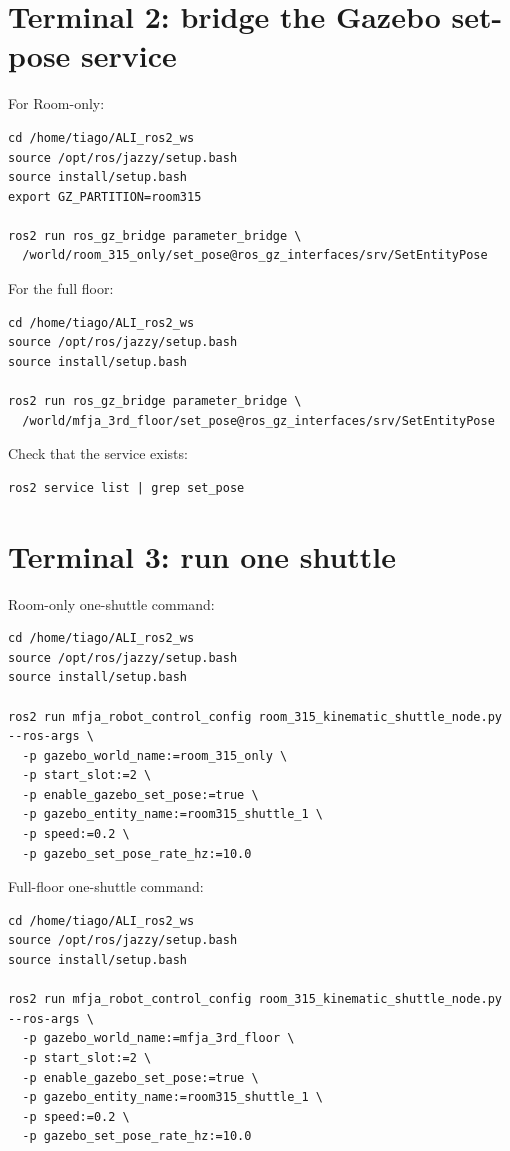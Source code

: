 \documentclass[12pt,a4paper]{report}
\begin{document}
\section{Terminal 2: bridge the Gazebo set-pose service}

For Room-only:

\begin{lstlisting}[style=terminalcode]
cd /home/tiago/ALI_ros2_ws
source /opt/ros/jazzy/setup.bash
source install/setup.bash
export GZ_PARTITION=room315

ros2 run ros_gz_bridge parameter_bridge \
  /world/room_315_only/set_pose@ros_gz_interfaces/srv/SetEntityPose
\end{lstlisting}

For the full floor:

\begin{lstlisting}[style=terminalcode]
cd /home/tiago/ALI_ros2_ws
source /opt/ros/jazzy/setup.bash
source install/setup.bash

ros2 run ros_gz_bridge parameter_bridge \
  /world/mfja_3rd_floor/set_pose@ros_gz_interfaces/srv/SetEntityPose
\end{lstlisting}

Check that the service exists:

\begin{lstlisting}[style=terminalcode]
ros2 service list | grep set_pose
\end{lstlisting}

\section{Terminal 3: run one shuttle}

Room-only one-shuttle command:

\begin{lstlisting}[style=terminalcode]
cd /home/tiago/ALI_ros2_ws
source /opt/ros/jazzy/setup.bash
source install/setup.bash

ros2 run mfja_robot_control_config room_315_kinematic_shuttle_node.py --ros-args \
  -p gazebo_world_name:=room_315_only \
  -p start_slot:=2 \
  -p enable_gazebo_set_pose:=true \
  -p gazebo_entity_name:=room315_shuttle_1 \
  -p speed:=0.2 \
  -p gazebo_set_pose_rate_hz:=10.0
\end{lstlisting}

Full-floor one-shuttle command:

\begin{lstlisting}[style=terminalcode]
cd /home/tiago/ALI_ros2_ws
source /opt/ros/jazzy/setup.bash
source install/setup.bash

ros2 run mfja_robot_control_config room_315_kinematic_shuttle_node.py --ros-args \
  -p gazebo_world_name:=mfja_3rd_floor \
  -p start_slot:=2 \
  -p enable_gazebo_set_pose:=true \
  -p gazebo_entity_name:=room315_shuttle_1 \
  -p speed:=0.2 \
  -p gazebo_set_pose_rate_hz:=10.0
\end{lstlisting}
\end{document}
